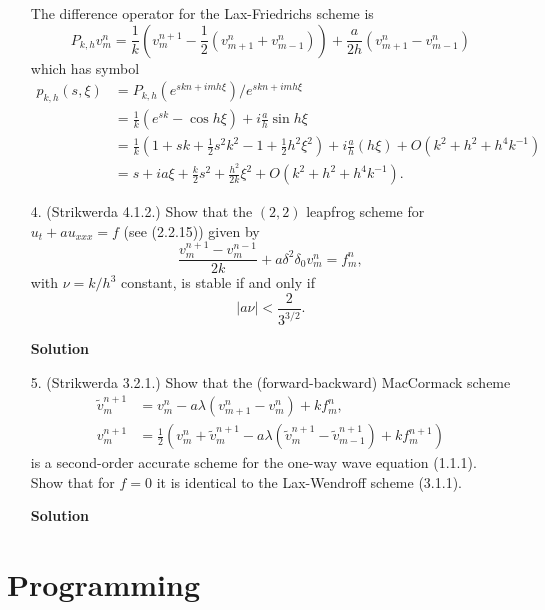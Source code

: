 \documentclass{article}
\providecommand{\abs}[1]{\left\lvert#1\right\rvert}
\begin{document}
\begin{itemize}
The difference operator for the Lax-Friedrichs scheme is
\begin{equation*}
P_{k,h} v^n_m = \frac{1}{k} \left( v^{n+1}_m - \frac{1}{2} \left( v^n_{m+1} + v^n_{m-1} \right) \right) + \frac{a}{2h} \left( v^n_{m+1} - v^n_{m-1} \right)
\end{equation*}
which has symbol
\begin{align*}
p_{k,h}(s,\xi) & = P_{k,h} \left( e^{skn + imh\xi} \right) / e^{skn + imh\xi} \\
               & = \frac{1}{k} \left( e^{sk} - \cos h \xi \right) + i \frac{a}{h} \sin h \xi \\
               & = \frac{1}{k} \left( 1 + sk + \frac{1}{2} s^2 k^2 - 1 + \frac{1}{2} h^2 \xi^2 \right) + i \frac{a}{h} \left( h \xi \right) + O \left( k^2 + h^2 + h^4 k^{-1} \right) \\
               & = s + i a \xi + \frac{k}{2} s^2 + \frac{h^2}{2k} \xi^2 + O \left( k^2 + h^2 + h^4 k^{-1} \right).
\end{align*}

\item[4.] (Strikwerda 4.1.2.) Show that the $(2,2)$ leapfrog scheme for $u_t + a u_{xxx} = f$ (see (2.2.15)) given by
\begin{equation*}
\frac{v^{n+1}_m - v^{n-1}_m}{2k} + a \delta^2 \delta_0 v^n_m = f^n_m,
\end{equation*}
with $\nu = k / h^3$ constant, is stable if and only if
\begin{equation*}
\abs{a \nu} < \frac{2}{3^{3/2}}.
\end{equation*}

\textbf{Solution}

\item[5.] (Strikwerda 3.2.1.) Show that the (forward-backward) MacCormack scheme
\begin{align*}
\tilde{v}^{n+1}_m & = v^n_m - a \lambda \left( v^n_{m+1} - v^n_m \right) + k f^n_m, \\
v^{n+1}_m & = \frac{1}{2} \left( v^n_m + \tilde{v}^{n+1}_m - a \lambda \left( \tilde{v}^{n+1}_m - \tilde{v}^{n+1}_{m-1} \right) + k f^{n+1}_m \right)
\end{align*}
is a second-order accurate scheme for the one-way wave equation (1.1.1). Show that for $f = 0$ it is identical to the Lax-Wendroff scheme (3.1.1).

\textbf{Solution}

\end{itemize}

\section{Programming}
\end{document}
